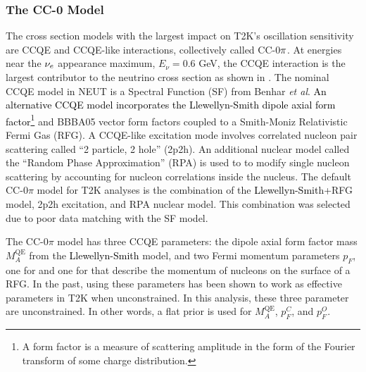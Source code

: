 \subsubsection{The CC-0\pititle{} Model}

The cross section models with the largest impact on T2K's oscillation
sensitivity are CCQE and CCQE-like interactions, collectively called
CC-0$\pi$. At energies near the $\nu_{e}$ appearance maximum, $E_{\nu}=0.6$
GeV, the CCQE interaction is the largest contributor to the neutrino
cross section as shown in . The
nominal CCQE model in NEUT is a Spectral Function (SF) from Benhar
\textit{et al}\cite{Benhar:1995}. \textcolor{black}{An alternative
CCQE model incorporates the Llewellyn-Smith dipole axial form factor}\footnote{A form factor is a measure of scattering amplitude in the form of
the Fourier transform of some charge distribution.}\cite{PhysRev.141.1298,LlewellynSmith:1971uhs} and BBBA05 vector
form factors coupled to a Smith-Moniz Relativistic Fermi Gas\cite{SMITH1972605,Niewczas:2015iea,Bradford2006}
(RFG). A CCQE-like excitation mode involves correlated nucleon pair
scattering called ``2 particle, 2 hole''\cite{Martini:2009uj} (2p2h).
An additional nuclear model called the ``Random Phase Approximation''
(RPA)\cite{Co:2006wnm,Nieves:2011pp} is used to to modify single
nucleon scattering by accounting for nucleon correlations inside the
nucleus. The default CC-$0\pi$ model for T2K analyses is the combination
of the \textcolor{black}{Llewellyn-Smit}h+RFG model, 2p2h excitation,
and RPA nuclear model. This combination was selected due to poor data
matching with the SF model\cite{Wret2019}.

The CC-$0\pi$ model has three CCQE parameters: the dipole axial form
factor mass $M_{A}^{\text{QE}}$ from the \textcolor{black}{Llewellyn-Smith}
model, and two Fermi momentum parameters $p_{F}$, one for 
and one for  that describe the momentum of nucleons on
the surface of a RFG. In the past, using these parameters has been
shown to work as effective parameters in T2K when unconstrained. In
this analysis, these three parameter are unconstrained. In other words,
a flat prior is used for $M_{A}^{\text{QE}}$, $p_{F}^{C}$, and $p_{F}^{O}$.

